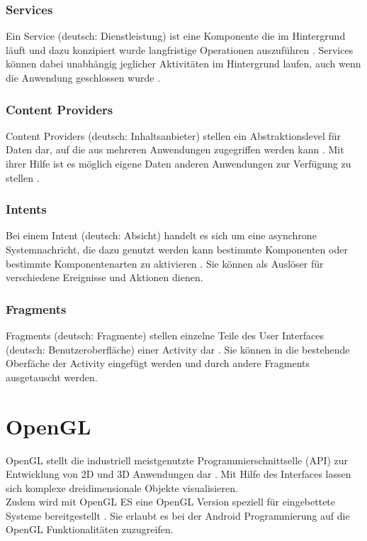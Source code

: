 \subsubsection{Services}
Ein Service (deutsch: \glqq Dienstleistung\grqq ) ist eine Komponente die im Hintergrund läuft und dazu konzipiert wurde langfristige Operationen auszuführen \citep{android:fundamentals}. Services können dabei unabhängig jeglicher Aktivitäten im Hintergrund laufen, auch wenn die Anwendung geschlossen wurde \citep{murphy:beginning-android}.

\subsubsection{Content Providers}
Content Providers (deutsch: \glqq Inhaltsanbieter\grqq ) stellen ein Abstraktionslevel für Daten dar, auf die aus mehreren Anwendungen zugegriffen werden kann \citep{murphy:beginning-android}. Mit ihrer Hilfe ist es möglich eigene Daten anderen Anwendungen zur Verfügung zu stellen \citep{murphy:beginning-android}. 

\subsubsection{Intents}
Bei einem Intent (deutsch: \glqq Absicht\grqq ) handelt es sich um eine asynchrone Systemnachricht, die dazu genutzt werden kann bestimmte Komponenten oder bestimmte Komponentenarten zu aktivieren \citep{android:fundamentals}. Sie können als Auslöser für verschiedene Ereignisse und Aktionen dienen.

\subsubsection{Fragments}
Fragments (deutsch: \glqq Fragmente\grqq) stellen einzelne Teile des User Interfaces (deutsch: \glqq Benutzeroberfläche\grqq) einer Activity dar \citep{android:fragments}. Sie können in die bestehende Oberfäche der Activity eingefügt werden und durch andere Fragments ausgetauscht werden.


\section{OpenGL}\label{OpenGL}
OpenGL stellt die industriell meistgenutzte Programmierschnittselle (API) zur Entwicklung von 2D und 3D Anwendungen dar \citep{khronos:opengl-overview}. Mit Hilfe des Interfaces lassen sich komplexe dreidimensionale Objekte visualisieren. \\
Zudem wird mit OpenGL ES eine OpenGL Version speziell für eingebettete Systeme bereitgestellt \citep{android:opengl}. Sie erlaubt es bei der Android Programmierung auf die OpenGL Funktionalitäten zuzugreifen.

